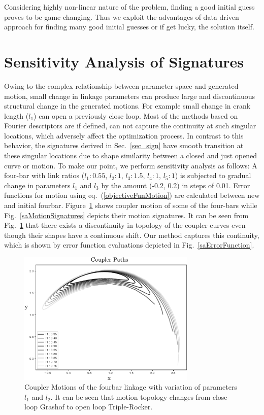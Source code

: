 \documentclass[twocolumn,10pt]{asme2e}
\newcommand{\req}[1]{(\ref{#1})}
\begin{document}
Considering highly non-linear nature of the problem, finding a good initial guess proves to be game changing.
Thus we exploit the advantages of data driven approach for finding many good initial guesses or if get lucky, the solution itself.

\section{Sensitivity Analysis of Signatures}\label{sec_SA}
Owing to the complex relationship between parameter space and generated motion, small change in linkage parameters can produce large and discontinuous structural change in the generated motions.
For example small change in crank length ($l_1$) can open a previously close loop.
Most of the methods based on Fourier descriptors are if defined, can not capture the continuity at such singular locations, which adversely affect the optimization process.
In contrast to this behavior, the signatures derived in Sec.~\ref{sec_sign} have smooth transition at these singular locations due to shape similarity between a closed and just opened curve or motion.
To make our point, we perform sensitivity analysis as follows:
A four-bar with link ratios ($l_1:0.55$, $l_2:1$, $l_3:1.5$, $l_4:1$, $l_5:1$) is subjected to gradual change in parameters $l_1$ and $l_3$ by the amount (-0.2, 0.2) in steps of 0.01.
Error functions for motion using eq.~\req{objectiveFunMotion} are calculated between new and initial fourbar.
Figure~\ref{saCouplerCurves} shows coupler motion of some of the four-bars while Fig.~\ref{saMotionSignatures} depicts their motion signatures.
It can be seen from Fig.~\ref{saCouplerCurves} that there exists a discontinuity in topology of the coupler curves even though their shapes have a continuous shift.
Our method captures this continuity, which is shown by error function evaluations depicted in Fig.~\ref{saErrorFunction}.

\begin{figure}
\centering
\includegraphics[width=240pt]{figure/fig_sa_coupler_curves.eps}
  \caption{Coupler Motions of the fourbar linkage with variation of parameters $l_1$ and $l_2$. It can be seen that motion topology changes from close-loop Grashof to open loop Triple-Rocker.}
\label{saCouplerCurves}
\end{figure}
\end{document}
